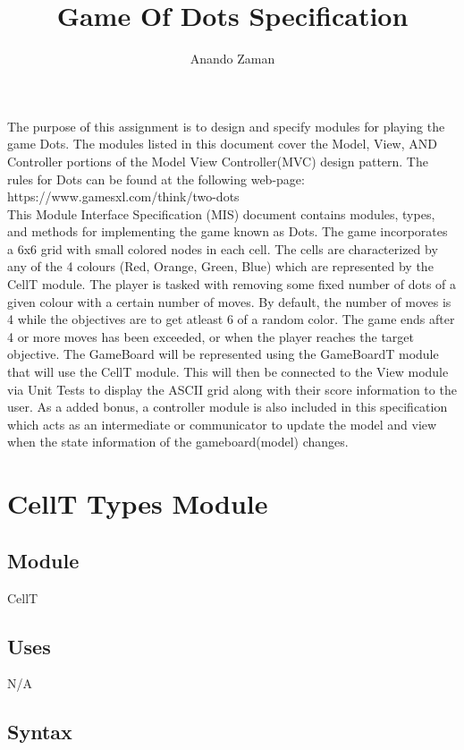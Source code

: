 \documentclass[12pt]{article}
\title{Game Of Dots Specification}
\author{Anando Zaman}
\begin{document}
\maketitle
The purpose of this assignment is to design and specify modules for playing the game
Dots.  The modules listed in this document cover the Model, View, AND Controller portions of
the Model View Controller(MVC) design pattern.  The rules for Dots can be found
at the following web-page: https://www.gamesxl.com/think/two-dots\\

\noindent This Module Interface Specification (MIS) document contains modules, types, and methods for implementing the game known as Dots. The game incorporates a 6x6 grid with small colored nodes in each cell. The cells are characterized by any of the 4 colours (Red, Orange, Green, Blue) which are represented by the CellT module. The player is tasked with removing some fixed number of dots of a given colour with a certain number of moves. By default, the number of moves is 4 while the objectives are to get atleast 6 of a random color. The game ends after 4 or more moves has been exceeded, or when the player reaches the target objective. The GameBoard will be represented using the GameBoardT module that will use the CellT module. This will then be connected to the View module via Unit Tests to display the ASCII grid along with their score information to the user. As a added bonus, a controller module is also included in this specification which acts as an intermediate or communicator to update the model and view when the state information of the gameboard(model) changes.

\newpage

\section* {CellT Types Module}

\subsection*{Module}

CellT

\subsection* {Uses}

N/A

\subsection* {Syntax}
\end{document}
